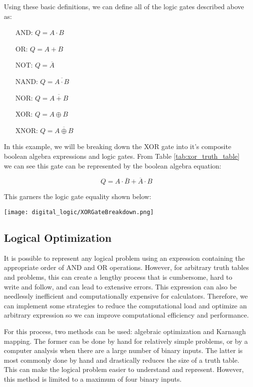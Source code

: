 Using these basic definitions, we can define all of the logic gates described above as:

\begin{itemize}
    \item [AND: ]{$Q = A \cdot B$}
    \item [OR: ]{$Q = A + B$}
    \item [NOT: ]{$Q = \overline{A}$}
    \item [NAND: ]{$Q = \overline{A \cdot B}$}
    \item [NOR: ]{$Q = \overline{A + B}$}
    \item [XOR: ]{$Q = A \oplus B$}
    \item [XNOR:]{$Q = \overline{A \oplus B}$}
\end{itemize}

\begin{example}
    In this example, we will be breaking down the XOR gate into it's composite boolean algebra expressions and logic gates.
    From Table \ref{tab:xor_truth_table} we can see this gate can be represented by the boolean algebra equation:
    
    \begin{equation*}
        Q = A \cdot \overline{B} + \overline{A} \cdot B
    \end{equation*}
    
    This garners the logic gate equality shown below:

    \texttt{[image: digital\_logic/XORGateBreakdown.png]}
\end{example}

    \subsection[]{Logical Optimization}
    It is possible to represent any logical problem using an expression containing the appropriate order of AND and OR operations.
    However, for arbitrary truth tables and problems, this can create a lengthy process that is cumbersome, hard to write and follow, and can lead to extensive errors.
    This expression can also be needlessly inefficient and computationally expensive for calculators.
    Therefore, we can implement some strategies to reduce the computational load and optimize an arbitrary expression so we can improve computational efficiency and performance.

    For this process, two methods can be used: algebraic optimization and Karnaugh mapping.
    The former can be done by hand for relatively simple problems, or by a computer analysis when there are a large number of binary inputs.
    The latter is most commonly done by hand and drastically reduces the size of a truth table.
    This can make the logical problem easier to understand and represent.
    However, this method is limited to a maximum of four binary inputs.


